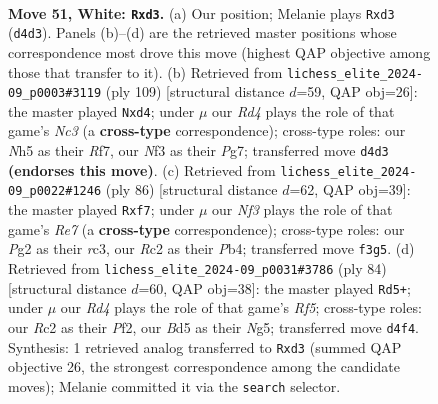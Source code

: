 \documentclass[11pt]{article}
\begin{document}
\clearpage

\begin{figure}[p]\centering
\begin{subfigure}{0.46\textwidth}\centering
\resizebox{\linewidth}{!}{%
\newchessgame
\chessboard[
  setfen={3r4/k7/8/1b1B1p1N/1P1R4/3r1N2/2R3P1/2K5 w - - 17 51},
  showmover=false,
  pgfstyle=straightmove, color=movearrow, markmove={d4-d3}
]}
\caption{}
\end{subfigure}\hfill
\begin{subfigure}{0.46\textwidth}\centering
\resizebox{\linewidth}{!}{%
\newchessgame
\chessboard[
  setfen={R4bk1/5rp1/p1n5/8/3N3P/2B5/5PK1/8 b - - 0 55},
  showmover=false,
  pgfstyle=straightmove, color=movearrow, markmove={c6-d4}
]}
\caption{}
\end{subfigure}
\\[4pt]
\begin{subfigure}{0.46\textwidth}\centering
\resizebox{\linewidth}{!}{%
\newchessgame
\chessboard[
  setfen={1r1k4/1R2Rp2/8/1K2Pp2/1P3Pp1/2r5/8/8 w - - 8 44},
  showmover=false,
  pgfstyle=straightmove, color=movearrow, markmove={e7-f7}
]}
\caption{}
\end{subfigure}\hfill
\begin{subfigure}{0.46\textwidth}\centering
\resizebox{\linewidth}{!}{%
\newchessgame
\chessboard[
  setfen={5rr1/3k4/4R3/5RN1/5P2/1Pb5/5P1P/6K1 w - - 3 43},
  showmover=false,
  pgfstyle=straightmove, color=movearrow, markmove={f5-d5}
]}
\caption{}
\end{subfigure}
\caption{\textbf{Move 51, White: \texttt{Rxd3}.} (a) Our position; Melanie plays \texttt{Rxd3} (\texttt{d4d3}). Panels (b)--(d) are the retrieved master positions whose correspondence most drove this move (highest QAP objective among those that transfer to it). (b) Retrieved from \texttt{lichess\_elite\_2024-09\_p0003\#3119} (ply 109) [structural distance $d$=59, QAP obj=26]: the master played \texttt{Nxd4}; under $\mu$ our \emph{Rd4} plays the role of that game's \emph{Nc3} (a \textbf{cross-type} correspondence); cross-type roles: our \emph{N}h5 as their \emph{R}f7, our \emph{N}f3 as their \emph{P}g7; transferred move \texttt{d4d3} \textbf{(endorses this move)}. (c) Retrieved from \texttt{lichess\_elite\_2024-09\_p0022\#1246} (ply 86) [structural distance $d$=62, QAP obj=39]: the master played \texttt{Rxf7}; under $\mu$ our \emph{Nf3} plays the role of that game's \emph{Re7} (a \textbf{cross-type} correspondence); cross-type roles: our \emph{P}g2 as their \emph{r}c3, our \emph{R}c2 as their \emph{P}b4; transferred move \texttt{f3g5}. (d) Retrieved from \texttt{lichess\_elite\_2024-09\_p0031\#3786} (ply 84) [structural distance $d$=60, QAP obj=38]: the master played \texttt{Rd5+}; under $\mu$ our \emph{Rd4} plays the role of that game's \emph{Rf5}; cross-type roles: our \emph{R}c2 as their \emph{P}f2, our \emph{B}d5 as their \emph{N}g5; transferred move \texttt{d4f4}. Synthesis: 1 retrieved analog transferred to \texttt{Rxd3} (summed QAP objective 26, the strongest correspondence among the candidate moves); Melanie committed it via the \texttt{search} selector.}
\label{fig:thought-m100}
\end{figure}
\end{document}

